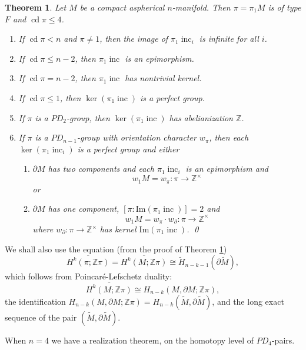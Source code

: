 \documentclass[12pt]{amsart}
\renewcommand{\leq}{\leqslant}
\newtheorem{theorem}{Theorem}
\theoremstyle{definition}
\newcommand{\Z}{\mathbb Z}
\DeclareMathOperator{\cd}{cd}
\DeclareMathOperator{\inc}{inc}
\newcommand{\ol}[1]{{\overline{#1}}}
\newcommand{\wt}[1]{{\widetilde{#1}}}
\begin{document}
\begin{theorem}
\label{cd<n}
Let $M$ be a compact aspherical $n$-manifold.
Then $\pi=\pi_1M$ is of type $F$ and $\cd\pi\leq4$.
\begin{enumerate}
\item If $\cd \pi < n$ and $\pi \not = 1$, then the image of $\pi_1\inc_i$ is infinite for all $i$.
\item If $\cd \pi \leq{n-2}$, then $\pi_1\inc$ is an epimorphism.
\item If $\cd \pi =n- 2$, then $\pi_1\inc$ has nontrivial kernel.
\item If $\cd \pi \leq1$, then  $\ker(\pi_1\inc)$ is a perfect group. 
\item If $\pi$ is a $PD_2$-group, then $\ker(\pi_1\inc)$ 
has abelianization  $\Z$.
\item If $\pi$ is a $PD_{n-1}$-group with orientation character $w_{\pi}$,
then each $\ker(\pi_1\inc_i)$ is a perfect group and either
\begin{enumerate}
\item $\partial M$ has two components and each $\pi_1\inc_i$ is an epimorphism and
$$
w_1M = w_\pi : \pi \to \Z^{\times}
$$ 
or
\item $\partial M$ has one component, 
$[\pi:\mathrm{Im}(\pi_1\inc)]=2$ and
$$
w_1M = w_{\pi} \cdot w_{\partial} : \pi \to \Z^{\times}
$$
where $w_\partial: \pi \to \Z^{\times}$ has kernel $\mathrm{Im}(\pi_1\inc)$.
\qed
\end{enumerate}
\end{enumerate}
\end{theorem}

We shall also use  the equation (from the proof of Theorem \ref{cd<n})
\begin{equation} \label{PLD}
 \ol{H^k(\pi; \Z\pi)} =\ol{H^k(M; \Z\pi)} \cong \wt H_{n-k-1}(\partial \wt M),
\end{equation}
which follows from  Poincar\'e-Lefschetz duality: 
\[
\ol{H^{k}(M; \Z\pi)} \cong H_{n-k}(M, \partial M; \Z\pi),
\]
 the identification $ H_{n-k}(M,\partial M; \Z\pi)=H_{n-k}(\wt M, \partial \wt M)$, 
 and the long exact sequence of the pair $(\wt M, \partial \wt M)$. 


When $n=4$ we have a realization theorem,
on the homotopy level of $PD_4$-pairs.
\end{document}
